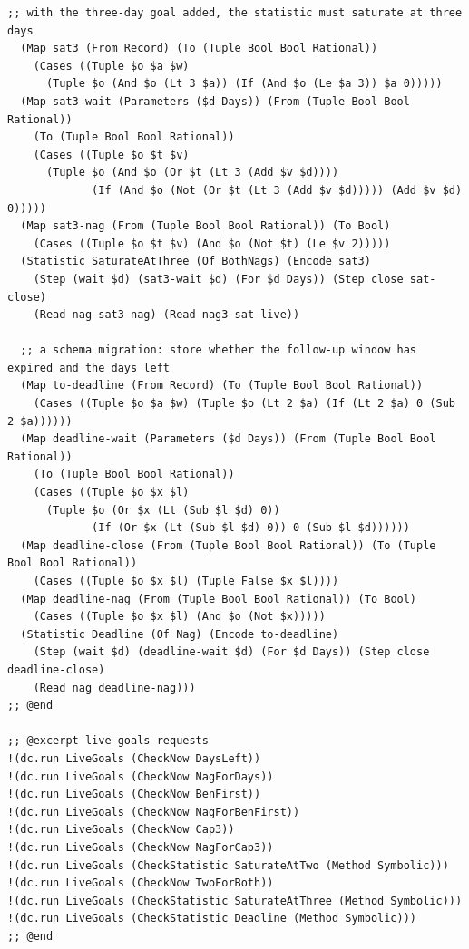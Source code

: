 \documentclass[11pt]{article}
\theoremstyle{definition}
\theoremstyle{plain}
\begin{document}
\begin{lstlisting}[style=mettafull]
  ;; with the three-day goal added, the statistic must saturate at three days
  (Map sat3 (From Record) (To (Tuple Bool Bool Rational))
    (Cases ((Tuple $o $a $w)
      (Tuple $o (And $o (Lt 3 $a)) (If (And $o (Le $a 3)) $a 0)))))
  (Map sat3-wait (Parameters ($d Days)) (From (Tuple Bool Bool Rational))
    (To (Tuple Bool Bool Rational))
    (Cases ((Tuple $o $t $v)
      (Tuple $o (And $o (Or $t (Lt 3 (Add $v $d))))
             (If (And $o (Not (Or $t (Lt 3 (Add $v $d))))) (Add $v $d) 0)))))
  (Map sat3-nag (From (Tuple Bool Bool Rational)) (To Bool)
    (Cases ((Tuple $o $t $v) (And $o (Not $t) (Le $v 2)))))
  (Statistic SaturateAtThree (Of BothNags) (Encode sat3)
    (Step (wait $d) (sat3-wait $d) (For $d Days)) (Step close sat-close)
    (Read nag sat3-nag) (Read nag3 sat-live))

  ;; a schema migration: store whether the follow-up window has expired and the days left
  (Map to-deadline (From Record) (To (Tuple Bool Bool Rational))
    (Cases ((Tuple $o $a $w) (Tuple $o (Lt 2 $a) (If (Lt 2 $a) 0 (Sub 2 $a))))))
  (Map deadline-wait (Parameters ($d Days)) (From (Tuple Bool Bool Rational))
    (To (Tuple Bool Bool Rational))
    (Cases ((Tuple $o $x $l)
      (Tuple $o (Or $x (Lt (Sub $l $d) 0))
             (If (Or $x (Lt (Sub $l $d) 0)) 0 (Sub $l $d))))))
  (Map deadline-close (From (Tuple Bool Bool Rational)) (To (Tuple Bool Bool Rational))
    (Cases ((Tuple $o $x $l) (Tuple False $x $l))))
  (Map deadline-nag (From (Tuple Bool Bool Rational)) (To Bool)
    (Cases ((Tuple $o $x $l) (And $o (Not $x)))))
  (Statistic Deadline (Of Nag) (Encode to-deadline)
    (Step (wait $d) (deadline-wait $d) (For $d Days)) (Step close deadline-close)
    (Read nag deadline-nag)))
;; @end

;; @excerpt live-goals-requests
!(dc.run LiveGoals (CheckNow DaysLeft))
!(dc.run LiveGoals (CheckNow NagForDays))
!(dc.run LiveGoals (CheckNow BenFirst))
!(dc.run LiveGoals (CheckNow NagForBenFirst))
!(dc.run LiveGoals (CheckNow Cap3))
!(dc.run LiveGoals (CheckNow NagForCap3))
!(dc.run LiveGoals (CheckStatistic SaturateAtTwo (Method Symbolic)))
!(dc.run LiveGoals (CheckNow TwoForBoth))
!(dc.run LiveGoals (CheckStatistic SaturateAtThree (Method Symbolic)))
!(dc.run LiveGoals (CheckStatistic Deadline (Method Symbolic)))
;; @end


\end{lstlisting}
\end{document}
